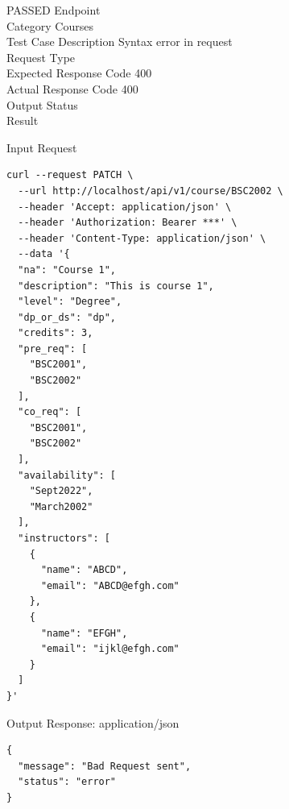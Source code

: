 \begin{testcase}{65}{PASSED}
Endpoint \hfill {}\\
Category \hfill Courses\\
Test Case Description \hfill Syntax error in request\\

Request Type    \hfill {}\\
Expected Response Code    \hfill 400\\
Actual Response Code    \hfill 400\\

Output Status \hfill {}\\
Result \hfill {}

\begin{ipblock}{Input Request}
\begin{verbatim}
curl --request PATCH \
  --url http://localhost/api/v1/course/BSC2002 \
  --header 'Accept: application/json' \
  --header 'Authorization: Bearer ***' \
  --header 'Content-Type: application/json' \
  --data '{
  "na": "Course 1",
  "description": "This is course 1",
  "level": "Degree",
  "dp_or_ds": "dp",
  "credits": 3,
  "pre_req": [
    "BSC2001",
    "BSC2002"
  ],
  "co_req": [
    "BSC2001",
    "BSC2002"
  ],
  "availability": [
    "Sept2022",
    "March2002"
  ],
  "instructors": [
    {
      "name": "ABCD",
      "email": "ABCD@efgh.com"
    },
    {
      "name": "EFGH",
      "email": "ijkl@efgh.com"
    }
  ]
}'
\end{verbatim}
\end{ipblock}

\begin{opblock}{Output Response: application/json}
\begin{verbatim}
{
  "message": "Bad Request sent",
  "status": "error"
}
\end{verbatim}
\end{opblock}
\end{testcase}

